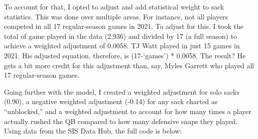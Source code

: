 \documentclass[
  letterpaper,
]{krantz}
\begin{document}
To account for that, I opted to adjust and add statistical weight to
sack statistics. This was done over multiple areas. For instance, not
all players competed in all 17 regular-season games in 2021. To adjust
for this, I took the total of game played in the data (2,936) and
divided by 17 (a full season) to achieve a weighted adjustment of
0.0058. TJ Watt played in just 15 games in 2021. His adjusted equation,
therefore, is (17-`games') * 0.0058. The result? He gets a bit more
credit for this adjustment than, say, Myles Garrett who played all 17
regular-season games.

Going further with the model, I created a weighted adjustment for solo
sacks (0.90), a negative weighted adjustment (-0.14) for any sack
charted as ``unblocked,'' and a weighted adjustment to account for how
many times a player actually rushed the QB compared to how many
defensive snaps they played. Using data from the SIS Data Hub, the full
code is below:
\end{document}
